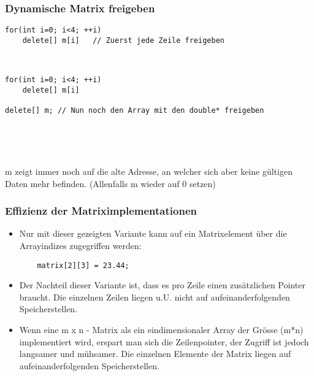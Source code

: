 \subsubsection{Dynamische Matrix freigeben\hfill}
\label{sec:Dynamische Matrix freigeben}
\noindent
\begin{minipage}{\linewidth}
\begin{lstlisting}
for(int i=0; i<4; ++i)
	delete[] m[i]	// Zuerst jede Zeile freigeben		
\end{lstlisting}
\end{minipage}
\begin{figure}[hh]
	\centering
	
	\\
	
\end{figure}
\vspace{1cm}
\noindent
\begin{minipage}{\linewidth}
\begin{lstlisting}
for(int i=0; i<4; ++i)
	delete[] m[i]

delete[] m;	// Nun noch den Array mit den double* freigeben
\end{lstlisting}
\end{minipage}
\begin{figure}[hh]
	\centering
	
	\\
	
\end{figure}
\\
\vspace{1cm}
\begin{achtung}
m zeigt immer noch auf die alte Adresse, an welcher sich aber keine gültigen Daten mehr befinden. (Allenfalls m wieder auf 0 setzen)
\end{achtung}

\subsubsection{Effizienz der Matriximplementationen\hfill}
\label{sec:Effizienz der Matriximplementationen}
\begin{itemize}
	\item Nur mit dieser gezeigten Variante kann auf ein Matrixelement über die Arrayindizes zugegriffen werden:
	\begin{minipage}{\linewidth}
	\begin{lstlisting}
	matrix[2][3] = 23.44;
	\end{lstlisting}
	\end{minipage}
	\item Der Nachteil dieser Variante ist, dass es pro Zeile einen zusätzlichen Pointer braucht. Die einzelnen Zeilen liegen u.U. nicht auf aufeinanderfolgenden Speicherstellen.
	\item Wenn eine m x n - Matrix als ein eindimensionaler Array der Grösse (m*n) implementiert wird, erspart man sich die Zeilenpointer, der Zugriff ist jedoch langsamer und mühsamer. Die einzelnen Elemente der Matrix liegen auf aufeinanderfolgenden Speicherstellen.
\end{itemize}


